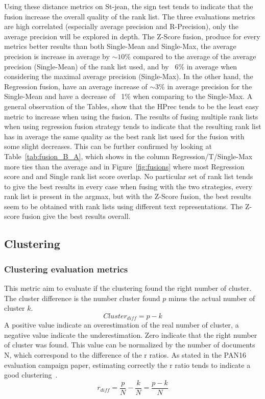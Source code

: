 Using these distance metrics on St-jean, the sign test tends to indicate that the fusion increase the overall quality of the rank list.
The three evaluations metrics are high correlated (especially average precision and R-Precision), only the average precision will be explored in depth.
The Z-Score fusion, produce for every metrics better results than both Single-Mean and Single-Max, the average precision is increase in average by $\sim 10$\% compared to the average of the average precision (Single-Mean) of the rank list used, and by ~6\% in average when considering the maximal average precision (Single-Max).
In the other hand, the Regression fusion, have an average increase of $\sim 3$\% in average precision for the Single-Mean and have a decrease of ~1\% when comparing to the Single-Max.
A general observation of the Tables, show that the HPrec tends to be the least easy metric to increase when using the fusion.
The results of fusing multiple rank lists when using regression fusion strategy tends to indicate that the resulting rank list has in average the same quality as the best rank list used for the fusion with some slight decreases.
This can be further confirmed by looking at Table~\ref{tab:fusion_B_A}, which shows in the column Regression/T/Single-Max more ties than the average and in Figure~\ref{fig:fusions} where most Regression score and and Single rank list score overlap.
No particular set of rank list tends to give the best results in every case when fusing with the two strategies, every rank list is present in the argmax, but with the Z-Score fusion, the best results seem to be obtained with rank lists using different text representations.
The Z-score fusion give the best results overall.

\subsection{Clustering}

\subsubsection{Clustering evaluation metrics}

\begin{definition}
  This metric aim to evaluate if the clustering found the right number of cluster.
  The cluster difference is the number cluster found $p$ minus the actual number of cluster $k$.
  \begin{equation}
    Cluster_{diff} = p - k
  \end{equation}
  A positive value indicate an overestimation of the real number of cluster, a negative value indicate the underestimation.
  Zero indicate that the right number of cluster was found.
  This value can be normalized by the number of documents N, which correspond to the difference of the r ratios.
  As stated in the PAN16 evaluation campaign paper, estimating correctly the r ratio tends to indicate a good clustering~\cite{pan16}.
  \begin{equation}
    r_{diff} = \frac{p}{N} - \frac{k}{N} = \frac{p - k}{N}
  \end{equation}
\end{definition}

